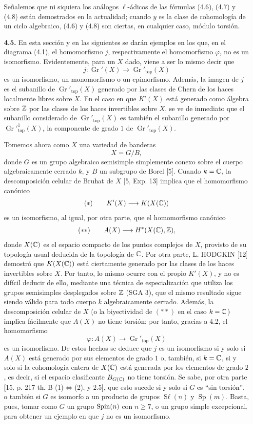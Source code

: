 Señalemos que ni siquiera los análogos $\ell$-ádicos de las fórmulas (4.6),
(4.7) y (4.8) están demostrados en la actualidad; cuando $y$ es la clase de
cohomología de un ciclo algebraico, (4.6) y (4.8) son ciertas, en cualquier
caso, módulo torsión.

\textbf{4.5.} En esta sección y en las siguientes se darán ejemplos en los
que, en el diagrama (4.1), el homomorfismo $j$, respectivamente el
homomorfismo $\varphi$, no es un isomorfismo. Evidentemente, para un $X$ dado,
viene a ser lo mismo decir que
\[
 j:\operatorname{Gr}'(X)\longrightarrow \operatorname{Gr}'_{\mathrm{top}}(X)
\]
es un isomorfismo, un monomorfismo o un epimorfismo. Además, la imagen de $j$
es el subanillo de $\operatorname{Gr}'_{\mathrm{top}}(X)$ generado por las
clases de Chern de los haces localmente libres sobre $X$. En el caso en que
$K'(X)$ está generado como álgebra sobre $\Z$ por las clases de los haces
invertibles sobre $X$, se ve de inmediato que el subanillo considerado de
$\operatorname{Gr}'_{\mathrm{top}}(X)$ es también el subanillo generado por
$\operatorname{Gr}'^{1}_{\mathrm{top}}(X)$, la componente de grado $1$ de
$\operatorname{Gr}'_{\mathrm{top}}(X)$.

Tomemos ahora como $X$ una variedad de banderas
\[
 X=G/B,
\]
donde $G$ es un grupo algebraico semisimple simplemente conexo sobre el
cuerpo algebraicamente cerrado $k$, y $B$ un subgrupo de Borel [5]. Cuando
$k=\C$, la descomposición celular de Bruhat de $X$ [5, Exp. 13] implica que
el homomorfismo canónico
\[
 (*)\qquad K'(X)\longrightarrow K(X(\C))
\]
es un isomorfismo, al igual, por otra parte, que el homomorfismo canónico
\[
 (**)\qquad A(X)\longrightarrow H^*(X(\C),\Z),
\]
donde $X(\C)$ es el espacio compacto de los puntos complejos de $X$, provisto
de su topología usual deducida de la topología de $\C$. Por otra parte, L.
HODGKIN [12] demostró que $K(X(\C))$ está ciertamente generado por las clases
de los haces invertibles sobre $X$. Por tanto, lo mismo ocurre con el propio
$K'(X)$, y no es difícil deducir de ello, mediante una técnica de
especialización que utiliza los grupos semisimples desplegados sobre $\Z$
(SGA 3), que el mismo resultado sigue siendo válido para todo cuerpo $k$
algebraicamente cerrado. Además, la descomposición celular de $X$ (o la
biyectividad de $(**)$ en el caso $k=\C$) implica fácilmente que $A(X)$ no
tiene torsión; por tanto, gracias a 4.2, el homomorfismo
\[
 \varphi:A(X)\longrightarrow\operatorname{Gr}'_{\mathrm{top}}(X)
\]
es un isomorfismo. De estos hechos se deduce que $j$ es un isomorfismo si y
solo si $A(X)$ está generado por sus elementos de grado $1$ o, también, si
$k=\C$, si y solo si la cohomología entera de $X(\C)$ está generada por los
elementos de grado $2$, es decir, si el espacio clasificante $B_{G(\C)}$ no
tiene torsión. Se sabe, por otra parte [15, p. 217 th. B
(1)$\Leftrightarrow$(2), y 2.5], que esto sucede si y solo si $G$ es ``sin
torsión'', o también si $G$ es isomorfo a un producto de grupos
$\operatorname{S\ell}(n)$ y $\operatorname{Sp}(m)$. Basta, pues, tomar como $G$
un grupo $\operatorname{\sisi{SO}{Spin}}(n)$ con $n\geq 7$, o un grupo simple excepcional, %
para obtener un ejemplo en que $j$ no es un isomorfismo.

